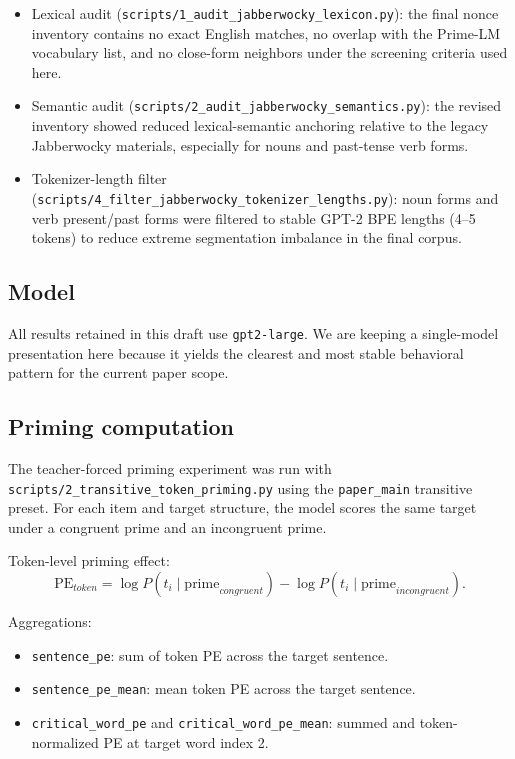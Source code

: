 \documentclass[11pt]{article}
\begin{document}
\begin{itemize}[leftmargin=*]
    \item Lexical audit
    (\texttt{scripts/1\_audit\_jabberwocky\_lexicon.py}): the final
    nonce inventory contains no exact English matches, no overlap with the
    Prime-LM vocabulary list, and no close-form neighbors under the screening
    criteria used here.
    \item Semantic audit
    (\texttt{scripts/2\_audit\_jabberwocky\_semantics.py}): the revised
    inventory showed reduced lexical-semantic anchoring relative to the legacy
    Jabberwocky materials, especially for nouns and past-tense verb forms.
    \item Tokenizer-length filter
    (\texttt{scripts/4\_filter\_jabberwocky\_tokenizer\_lengths.py}):
    noun forms and verb present/past forms were filtered to stable GPT-2 BPE
    lengths (4--5 tokens) to reduce extreme segmentation imbalance in the final
    corpus.
\end{itemize}

\subsection*{Model}

All results retained in this draft use \texttt{gpt2-large}. We are keeping a
single-model presentation here because it yields the clearest and most stable
behavioral pattern for the current paper scope.

\subsection*{Priming computation}

The teacher-forced priming experiment was run with
\texttt{scripts/2\_transitive\_token\_priming.py} using the
\texttt{paper\_main} transitive preset. For each item and target structure, the
model scores the same target under a congruent prime and an incongruent prime.

Token-level priming effect:
\[
\mathrm{PE}_{token} = \log P(t_i \mid \text{prime}_{congruent}) - \log P(t_i \mid \text{prime}_{incongruent}).
\]

Aggregations:

\begin{itemize}[leftmargin=*]
    \item \texttt{sentence\_pe}: sum of token PE across the target sentence.
    \item \texttt{sentence\_pe\_mean}: mean token PE across the target sentence.
    \item \texttt{critical\_word\_pe} and \texttt{critical\_word\_pe\_mean}:
    summed and token-normalized PE at target word index 2.
\end{itemize}
\end{document}
